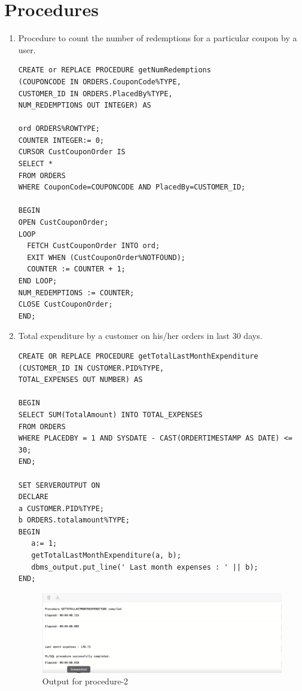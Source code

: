 \documentclass[12pt,letterpaper]{article}
\begin{document}
\section{Procedures}
\begin{enumerate}
    \item Procedure to count the number of redemptions for a particular coupon by a user.
    \begin{lstlisting}
CREATE or REPLACE PROCEDURE getNumRedemptions 
(COUPONCODE IN ORDERS.CouponCode%TYPE, 
CUSTOMER_ID IN ORDERS.PlacedBy%TYPE, 
NUM_REDEMPTIONS OUT INTEGER) AS 

ord ORDERS%ROWTYPE; 
COUNTER INTEGER:= 0; 
CURSOR CustCouponOrder IS
SELECT * 
FROM ORDERS 
WHERE CouponCode=COUPONCODE AND PlacedBy=CUSTOMER_ID;

BEGIN
OPEN CustCouponOrder;
LOOP
  FETCH CustCouponOrder INTO ord;
  EXIT WHEN (CustCouponOrder%NOTFOUND);
  COUNTER := COUNTER + 1;
END LOOP;
NUM_REDEMPTIONS := COUNTER;
CLOSE CustCouponOrder;
END;

\end{lstlisting}



\item Total expenditure by a customer on his/her orders in last 30 days.
\begin{lstlisting}
CREATE OR REPLACE PROCEDURE getTotalLastMonthExpenditure 
(CUSTOMER_ID IN CUSTOMER.PID%TYPE, 
TOTAL_EXPENSES OUT NUMBER) AS

BEGIN
SELECT SUM(TotalAmount) INTO TOTAL_EXPENSES 
FROM ORDERS 
WHERE PLACEDBY = 1 AND SYSDATE - CAST(ORDERTIMESTAMP AS DATE) <= 30;
END;

SET SERVEROUTPUT ON
DECLARE
a CUSTOMER.PID%TYPE;
b ORDERS.totalamount%TYPE;
BEGIN
   a:= 1;
   getTotalLastMonthExpenditure(a, b);
   dbms_output.put_line(' Last month expenses : ' || b);
END;

\end{lstlisting}

\begin{figure}[H]
 \begin{center}
     \includegraphics[scale=1]{figures/Picture22.png}
     \caption{Output for procedure-2}
     \label{fig:proc-2}
 \end{center}
\end{figure}

\end{enumerate}
\end{document}
